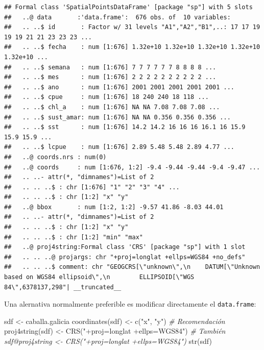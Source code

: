 \documentclass[
  spanish,
]{book}
\newenvironment{Shaded}{\begin{snugshade}}{\end{snugshade}}
\newcommand{\CommentTok}[1]{\textcolor[rgb]{0.56,0.35,0.01}{\textit{#1}}}
\newcommand{\FunctionTok}[1]{\textcolor[rgb]{0.00,0.00,0.00}{#1}}
\newcommand{\NormalTok}[1]{#1}
\newcommand{\OtherTok}[1]{\textcolor[rgb]{0.56,0.35,0.01}{#1}}
\newcommand{\StringTok}[1]{\textcolor[rgb]{0.31,0.60,0.02}{#1}}
\theoremstyle{break}
\theoremstyle{definition}
\theoremstyle{definition}
\theoremstyle{definition}
\theoremstyle{definition}
\theoremstyle{remark}
\begin{document}
\begin{verbatim}
## Formal class 'SpatialPointsDataFrame' [package "sp"] with 5 slots
##   ..@ data       :'data.frame':  676 obs. of  10 variables:
##   .. ..$ id       : Factor w/ 31 levels "A1","A2","B1",..: 17 17 19 19 19 21 21 23 23 23 ...
##   .. ..$ fecha    : num [1:676] 1.32e+10 1.32e+10 1.32e+10 1.32e+10 1.32e+10 ...
##   .. ..$ semana   : num [1:676] 7 7 7 7 7 7 8 8 8 8 ...
##   .. ..$ mes      : num [1:676] 2 2 2 2 2 2 2 2 2 2 ...
##   .. ..$ ano      : num [1:676] 2001 2001 2001 2001 2001 ...
##   .. ..$ cpue     : num [1:676] 18 240 240 18 118 ...
##   .. ..$ chl_a    : num [1:676] NA NA 7.08 7.08 7.08 ...
##   .. ..$ sust_amar: num [1:676] NA NA 0.356 0.356 0.356 ...
##   .. ..$ sst      : num [1:676] 14.2 14.2 16 16 16 16.1 16 15.9 15.9 15.9 ...
##   .. ..$ lcpue    : num [1:676] 2.89 5.48 5.48 2.89 4.77 ...
##   ..@ coords.nrs : num(0) 
##   ..@ coords     : num [1:676, 1:2] -9.4 -9.44 -9.44 -9.4 -9.47 ...
##   .. ..- attr(*, "dimnames")=List of 2
##   .. .. ..$ : chr [1:676] "1" "2" "3" "4" ...
##   .. .. ..$ : chr [1:2] "x" "y"
##   ..@ bbox       : num [1:2, 1:2] -9.57 41.86 -8.03 44.01
##   .. ..- attr(*, "dimnames")=List of 2
##   .. .. ..$ : chr [1:2] "x" "y"
##   .. .. ..$ : chr [1:2] "min" "max"
##   ..@ proj4string:Formal class 'CRS' [package "sp"] with 1 slot
##   .. .. ..@ projargs: chr "+proj=longlat +ellps=WGS84 +no_defs"
##   .. .. ..$ comment: chr "GEOGCRS[\"unknown\",\n    DATUM[\"Unknown based on WGS84 ellipsoid\",\n        ELLIPSOID[\"WGS 84\",6378137,298"| __truncated__
\end{verbatim}

Una alernativa normalmente preferible es modificar directamente
el \texttt{data.frame}:

\begin{Shaded}
\begin{Highlighting}[]
\NormalTok{sdf }\OtherTok{\textless{}{-}}\NormalTok{ caballa.galicia}
\FunctionTok{coordinates}\NormalTok{(sdf) }\OtherTok{\textless{}{-}} \FunctionTok{c}\NormalTok{(}\StringTok{"x"}\NormalTok{, }\StringTok{"y"}\NormalTok{) }\CommentTok{\# Recomendación}
\FunctionTok{proj4string}\NormalTok{(sdf) }\OtherTok{\textless{}{-}} \FunctionTok{CRS}\NormalTok{(}\StringTok{"+proj=longlat +ellps=WGS84"}\NormalTok{)  }\CommentTok{\# También sdf@proj4string \textless{}{-} CRS("+proj=longlat +ellps=WGS84")}
\FunctionTok{str}\NormalTok{(sdf)}
\end{Highlighting}
\end{Shaded}
\end{document}
